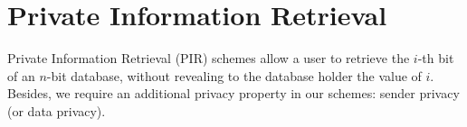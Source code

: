 

\fi


\section{Private Information Retrieval}
Private Information Retrieval (PIR) schemes\cite{FOCS:CGKS95} allow a user to retrieve the $i$-th bit of an $n$-bit database, without revealing to the database holder the value of $i$. Besides, we require an additional privacy property in our schemes: sender privacy (or data privacy)\cite{EC:DiCMalOst00}.

